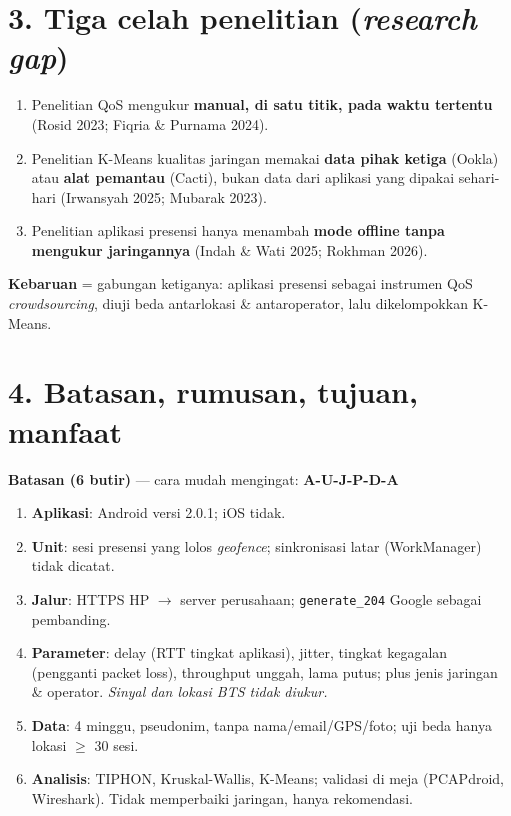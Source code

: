 \section*{3. Tiga celah penelitian (\textit{research gap})}
\begin{enumerate}
  \item Penelitian QoS mengukur \textbf{manual, di satu titik, pada waktu tertentu} (Rosid 2023; Fiqria \& Purnama 2024).
  \item Penelitian K-Means kualitas jaringan memakai \textbf{data pihak ketiga} (Ookla) atau \textbf{alat pemantau} (Cacti), bukan data dari aplikasi yang dipakai sehari-hari (Irwansyah 2025; Mubarak 2023).
  \item Penelitian aplikasi presensi hanya menambah \textbf{mode offline tanpa mengukur jaringannya} (Indah \& Wati 2025; Rokhman 2026).
\end{enumerate}
\textbf{Kebaruan} = gabungan ketiganya: aplikasi presensi sebagai instrumen QoS \textit{crowdsourcing}, diuji beda antarlokasi \& antaroperator, lalu dikelompokkan K-Means.

\section*{4. Batasan, rumusan, tujuan, manfaat}
\textbf{Batasan (6 butir)} --- cara mudah mengingat: \textbf{A-U-J-P-D-A}
\begin{enumerate}[label=\textbf{\Alph*}]
  \item[\textbf{A}] \textbf{Aplikasi}: Android versi 2.0.1; iOS tidak.
  \item[\textbf{U}] \textbf{Unit}: sesi presensi yang lolos \textit{geofence}; sinkronisasi latar (WorkManager) tidak dicatat.
  \item[\textbf{J}] \textbf{Jalur}: HTTPS HP $\rightarrow$ server perusahaan; \texttt{generate\_204} Google sebagai pembanding.
  \item[\textbf{P}] \textbf{Parameter}: delay (RTT tingkat aplikasi), jitter, tingkat kegagalan (pengganti packet loss), throughput unggah, lama putus; plus jenis jaringan \& operator. \textit{Sinyal dan lokasi BTS tidak diukur.}
  \item[\textbf{D}] \textbf{Data}: 4 minggu, pseudonim, tanpa nama/email/GPS/foto; uji beda hanya lokasi $\geq$ 30 sesi.
  \item[\textbf{A}] \textbf{Analisis}: TIPHON, Kruskal-Wallis, K-Means; validasi di meja (PCAPdroid, Wireshark). Tidak memperbaiki jaringan, hanya rekomendasi.
\end{enumerate}

